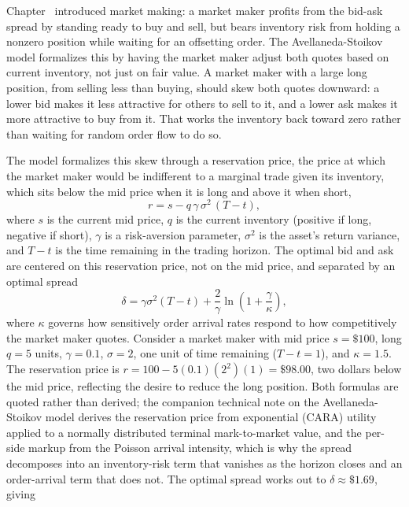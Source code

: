 \documentclass[../ai_in_finance]{subfiles}
\begin{document}
Chapter~ introduced market making: a market maker profits from the bid-ask spread by standing ready to buy and sell, but bears inventory risk from holding a nonzero position while waiting for an offsetting order. The Avellaneda-Stoikov model formalizes this by having the market maker adjust both quotes based on current inventory, not just on fair value. A market maker with a large long position, from selling less than buying, should skew both quotes downward: a lower bid makes it less attractive for others to sell to it, and a lower ask makes it more attractive to buy from it. That works the inventory back toward zero rather than waiting for random order flow to do so.

The model formalizes this skew through a reservation price, the price at which the market maker would be indifferent to a marginal trade given its inventory, which sits below the mid price when it is long and above it when short,
\begin{equation}
r = s - q\,\gamma\,\sigma^2\,(T-t),
\label{eq:algotrading-as-reservation}
\end{equation}
where $s$ is the current mid price, $q$ is the current inventory (positive if long, negative if short), $\gamma$ is a risk-aversion parameter, $\sigma^2$ is the asset's return variance, and $T-t$ is the time remaining in the trading horizon. The optimal bid and ask are centered on this reservation price, not on the mid price, and separated by an optimal spread
\begin{equation}
\delta = \gamma\sigma^2(T-t) + \frac{2}{\gamma}\ln\left(1+\frac{\gamma}{\kappa}\right),
\label{eq:algotrading-as-spread}
\end{equation}
where $\kappa$ governs how sensitively order arrival rates respond to how competitively the market maker quotes. Consider a market maker with mid price $s=\$100$, long $q=5$ units, $\gamma=0.1$, $\sigma=2$, one unit of time remaining ($T-t=1$), and $\kappa=1.5$. The reservation price is $r = 100 - 5(0.1)(2^2)(1) = \$98.00$, two dollars below the mid price, reflecting the desire to reduce the long position. Both formulas are quoted rather than derived; the companion technical note on the Avellaneda-Stoikov model derives the reservation price from exponential (CARA) utility applied to a normally distributed terminal mark-to-market value, and the per-side markup from the Poisson arrival intensity, which is why the spread decomposes into an inventory-risk term that vanishes as the horizon closes and an order-arrival term that does not. The optimal spread works out to $\delta \approx \$1.69$, giving
\end{document}
